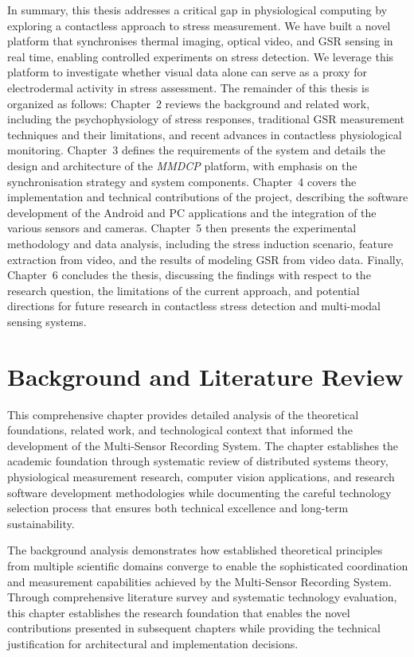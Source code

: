 \documentclass[11pt,a4paper]{report}
\begin{document}
In summary, this thesis addresses a critical gap in physiological computing by exploring a contactless approach to stress measurement. We have built a novel platform that synchronises thermal imaging, optical video, and GSR sensing in real time, enabling controlled experiments on stress detection. We leverage this platform to investigate whether visual data alone can serve as a proxy for electrodermal activity in stress assessment. The remainder of this thesis is organized as follows: Chapter~2 reviews the background and related work, including the psychophysiology of stress responses, traditional GSR measurement techniques and their limitations, and recent advances in contactless physiological monitoring. Chapter~3 defines the requirements of the system and details the design and architecture of the \textit{MMDCP} platform, with emphasis on the synchronisation strategy and system components. Chapter~4 covers the implementation and technical contributions of the project, describing the software development of the Android and PC applications and the integration of the various sensors and cameras. Chapter~5 then presents the experimental methodology and data analysis, including the stress induction scenario, feature extraction from video, and the results of modeling GSR from video data. Finally, Chapter~6 concludes the thesis, discussing the findings with respect to the research question, the limitations of the current approach, and potential directions for future research in contactless stress detection and multi-modal sensing systems.

\chapter{Background and Literature Review}

This comprehensive chapter provides detailed analysis of the theoretical foundations, related work, and technological context that informed the development of the Multi-Sensor Recording System. The chapter establishes the academic foundation through systematic review of distributed systems theory, physiological measurement research, computer vision applications, and research software development methodologies while documenting the careful technology selection process that ensures both technical excellence and long-term sustainability.

The background analysis demonstrates how established theoretical principles from multiple scientific domains converge to enable the sophisticated coordination and measurement capabilities achieved by the Multi-Sensor Recording System. Through comprehensive literature survey and systematic technology evaluation, this chapter establishes the research foundation that enables the novel contributions presented in subsequent chapters while providing the technical justification for architectural and implementation decisions.
\end{document}
